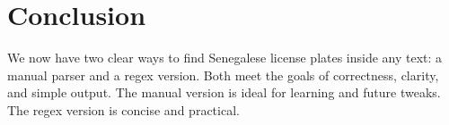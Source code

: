 \documentclass[12pt,a4paper]{article}
\begin{document}
\section{Conclusion}
We now have two clear ways to find Senegalese license plates inside any text: a manual parser and a regex version. Both meet the goals of correctness, clarity, and simple output. The manual version is ideal for learning and future tweaks. The regex version is concise and practical.
\end{document}
